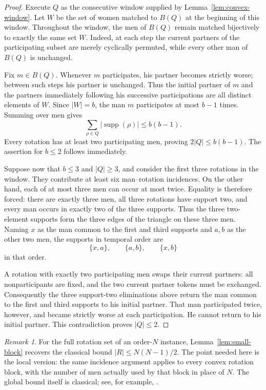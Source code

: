 \documentclass[11pt]{article}
\numberwithin{equation}{section}
\theoremstyle{definition}
\theoremstyle{remark}
\newtheorem{remark}[theorem]{Remark}
\newcommand{\supp}{\operatorname{supp}}
\begin{document}
\begin{proof}
Execute $Q$ as the consecutive window supplied by
Lemma~\ref{lem:convex-window}.  Let $W$ be the set of women matched to
$B(Q)$ at the beginning of this window.  Throughout the window, the men of
$B(Q)$ remain matched bijectively to exactly the same set $W$.  Indeed, at
each step the current partners of the participating subset are merely
cyclically permuted, while every other man of $B(Q)$ is unchanged.

Fix $m\in B(Q)$.  Whenever $m$ participates, his partner becomes strictly
worse; between such steps his partner is unchanged.  Thus the initial
partner of $m$ and the partners immediately following his successive
participations are all distinct elements of $W$.  Since $|W|=b$, the man
$m$ participates at most $b-1$ times.  Summing over men gives
\[
 \sum_{\rho\in Q}|\supp(\rho)|
 \le b(b-1).
\]
Every rotation has at least two participating men, proving
$2|Q|\le b(b-1)$.  The assertion for $b\le2$ follows immediately.

Suppose now that $b\le3$ and $|Q|\ge3$, and consider the first three
rotations in the window.  They contribute at least six man--rotation
incidences.  On the other hand, each of at most three men can occur at most
twice.  Equality is therefore forced: there are exactly three men, all
three rotations have support two, and every man occurs in exactly two of
the three supports.  Thus the three two-element supports form the three
edges of the triangle on these three men.  Naming $x$ as the man common to
the first and third supports and $a,b$ as the other two men, the supports
in temporal order are
\[
        \{x,a\},\qquad \{a,b\},\qquad \{x,b\}
\]
in that order.

A rotation with exactly two participating men swaps their current partners:
all nonparticipants are fixed, and the two current partner tokens must be
exchanged.  Consequently the three support-two eliminations above return
the man common to the first and third supports to his initial partner.
That man participated twice, however, and became strictly worse at each
participation.  He cannot return to his initial partner.  This contradiction
proves $|Q|\le2$.
\end{proof}

\begin{remark}\label{rem:local-global}
For the full rotation set of an order-$N$ instance,
Lemma~\ref{lem:small-block} recovers the classical bound
$|R|\le N(N-1)/2$.  The point needed here is the local version: the same
incidence argument applies to every convex rotation block, with the number
of men actually used by that block in place of $N$.  The global bound itself
is classical; see, for example, \cite{BhatnagarGR2008}.
\end{remark}
\end{document}
